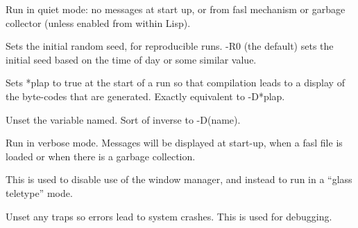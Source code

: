 \hspace*{.25in}\parbox{4.5in}{
Run in quiet mode: no messages at start up, or from fasl
mechanism or garbage collector (unless enabled from within
Lisp). }

\vspace{2mm} 
\vspace{1mm}

\hspace*{.25in}\parbox{4.5in}{
Sets the initial random seed, for reproducible runs.  -R0 (the
default) sets the initial seed based on the time of day or some
similar value.} 

\vspace{2mm} 
\vspace{1mm}

\hspace*{.25in}\parbox{4.5in}{
Sets *plap to true at the start of a run so that compilation
leads to a display of the byte-codes that are generated.
Exactly equivalent to -D*plap. }

\vspace{2mm} 
\vspace{1mm}

\hspace*{.25in}\parbox{4.5in}{
Unset the variable named.  Sort of inverse to -D(name).}

\vspace{2mm} 
\vspace{1mm}

\hspace*{.25in}\parbox{4.5in}{
Run in verbose mode.  Messages will be displayed at start-up,
when a fasl file is loaded or when there is a garbage
collection. }

\vspace{2mm} 
\vspace{1mm}

\hspace*{.25in}\parbox{4.5in}{
This is used to disable use of the window manager, and instead to run
in a ``glass teletype'' mode.
}

\vspace{2mm}
\vspace{1mm}

\hspace*{.25in}\parbox{4.5in}{
Unset any traps so errors lead to system crashes.  This is used for debugging.
}

